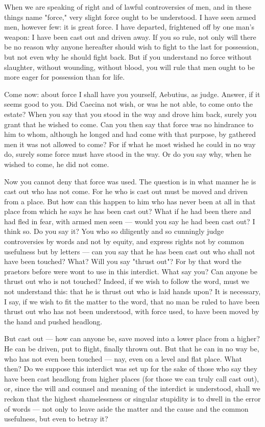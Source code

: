  When we are speaking of right and of lawful controversies of men, and in these things name "force," very slight force ought to be understood. I have seen armed men, however few: it is great force. I have departed, frightened off by one man's weapon: I have been cast out and driven away. If you so rule, not only will there be no reason why anyone hereafter should wish to fight to the last for possession, but not even why he should fight back. But if you understand no force without slaughter, without wounding, without blood, you will rule that men ought to be more eager for possession than for life.

 Come now: about force I shall have you yourself, Aebutius, as judge. Answer, if it seems good to you. Did Caecina not wish, or was he not able, to come onto the estate? When you say that you stood in the way and drove him back, surely you grant that he wished to come. Can you then say that force was no hindrance to him to whom, although he longed and had come with that purpose, by gathered men it was not allowed to come? For if what he most wished he could in no way do, surely some force must have stood in the way. Or do you say why, when he wished to come, he did not come.

 Now you cannot deny that force was used. The question is in what manner he is cast out who has not come. For he who is cast out must be moved and driven from a place. But how can this happen to him who has never been at all in that place from which he says he has been cast out? What if he had been there and had fled in fear, with armed men seen --- would you say he had been cast out? I think so. Do you say it? You who so diligently and so cunningly judge controversies by words and not by equity, and express rights not by common usefulness but by letters --- can you say that he has been cast out who shall not have been touched? What? Will you say "thrust out"? For by that word the praetors before were wont to use in this interdict. What say you? Can anyone be thrust out who is not touched? Indeed, if we wish to follow the word, must we not understand this: that he is thrust out who is laid hands upon? It is necessary, I say, if we wish to fit the matter to the word, that no man be ruled to have been thrust out who has not been understood, with force used, to have been moved by the hand and pushed headlong.

 But cast out --- how can anyone be, save moved into a lower place from a higher? He can be driven, put to flight, finally thrown out. But that he can in no way be, who has not even been touched --- nay, even on a level and flat place. What then? Do we suppose this interdict was set up for the sake of those who say they have been cast headlong from higher places (for those we can truly call cast out), or, since the will and counsel and meaning of the interdict is understood, shall we reckon that the highest shamelessness or singular stupidity is to dwell in the error of words --- not only to leave aside the matter and the cause and the common usefulness, but even to betray it?


